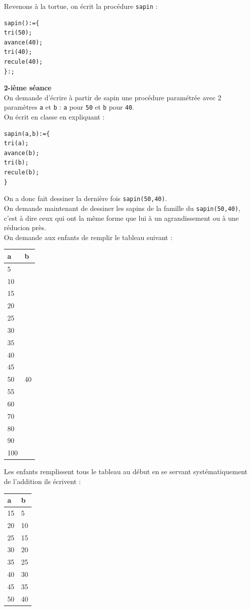 \documentclass[a4paper,11pt]{book}
\begin{document}
Revenons \`a la tortue, on \'ecrit la proc\'edure {\tt sapin} :
\begin{verbatim}
sapin():={
tri(50);
avance(40);
tri(40);
recule(40);
}:;
\end{verbatim}

{\bf 2-i\`eme s\'eance}\\
On demande d'\'ecrire \`a partir de sapin une proc\'edure param\'etr\'ee avec 
2 param\`etres {\tt a}  et {\tt b} : {\tt a} pour {\tt 50} et {\tt b} pour 
{\tt 40}.\\
On \'ecrit en classe en expliquant : 
\begin{verbatim}
sapin(a,b):={
tri(a);
avance(b);
tri(b);
recule(b);
}
\end{verbatim}
On a donc fait dessiner la derni\`ere fois {\tt sapin(50,40)}.\\
On demande maintenant de dessiner les sapins de la famille du   
{\tt sapin(50,40)},
c'est \`a dire ceux qui ont la m\^eme forme 
que lui \`a un agrandissement ou \`a une r\'educion pr\`es.\\
On demande aux enfants de remplir le tableau suivant :\\
\begin{tabular}{|l|l|}
\hline
a &b\\
\hline
5& \\
10& \\
15& \\
20& \\
25& \\
30& \\
35& \\
40& \\
45& \\
50&40 \\
55& \\
60& \\
70& \\
80& \\
90& \\
100& \\
\hline
\end{tabular}

Les enfants remplissent tous le tableau au d\'ebut en se servant 
syst\'ematiquement de l'addition ils \'ecrivent :\\
\begin{tabular}{|l|l|}
\hline
a &b\\
\hline
15& 5\\
20& 10\\
25& 15\\
30& 20\\
35& 25\\
40& 30\\
45& 35\\
50& 40 \\
\hline
\end{tabular}
\end{document}
